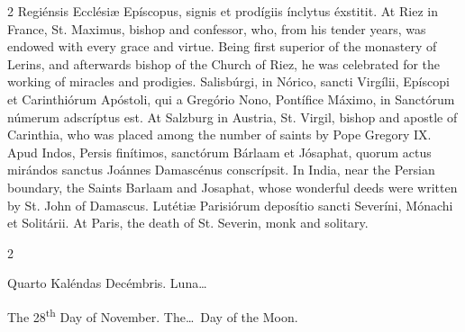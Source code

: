 \begin{paracol}{2}
 Regiénsis Ecclésiæ Epíscopus, signis et prodígiis ínclytus éxstitit.
\switchcolumn
{}
At Riez in France, St. Maximus, 
 bishop and confessor, who, from his tender years, was endowed with every 
 grace and virtue. Being first superior of the monastery of Lerins, and 
 afterwards bishop of the Church of Riez, he was celebrated for the working 
 of miracles and prodigies.
\switchcolumn*
{}
Salisbúrgi, in Nórico, 
 sancti Virgílii, Epíscopi et Carinthiórum Apóstoli, qui a Gregório Nono, 
 Pontífice Máximo, in Sanctórum númerum adscríptus est.
\switchcolumn
{}
At Salzburg in Austria, St. Virgil, 
 bishop and apostle of Carinthia, who was placed among the number of saints 
 by Pope Gregory IX.
\switchcolumn*
{}
Apud Indos, Persis 
 finítimos, sanctórum Bárlaam et Jósaphat, quorum actus mirándos sanctus 
 Joánnes Damascénus conscrípsit.
\switchcolumn
{}
In India, near the Persian boundary, 
 the Saints Barlaam and Josaphat, whose wonderful deeds were written by St. 
 John of Damascus.
\switchcolumn*
{}
Lutétiæ Parisiórum 
 deposítio sancti Severíni, Mónachi et Solitárii.
\switchcolumn
{}
At Paris, the death of St. Severin, 
 monk and solitary.
\switchcolumn*
{}
\end{paracol}


\begin{paracol}{2}
\begin{center}{\color{gregoriocolor} Quarto Kaléndas Decémbris. 
 Luna\dots\ }\end{center}
\switchcolumn
{}
\begin{center}{\color{gregoriocolor} The 
 28\textsuperscript{th} Day of 
 November. The\dots\ Day of the Moon.}\end{center}
\end{paracol}

